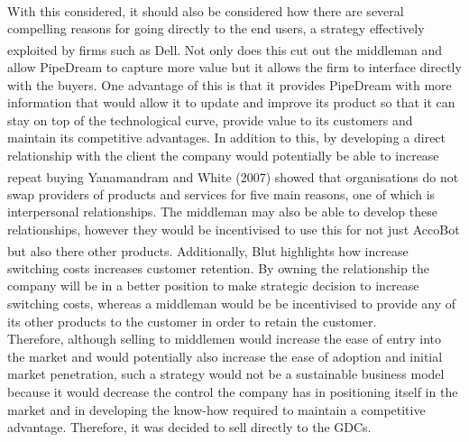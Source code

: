 \documentclass[11pt]{article}		%
\newcommand{\supercite}[1]{\textsuperscript{\cite{#1}}}		%
\begin{document}
    \\
    \hspace*{3ex}With this considered, it should also be considered how there are several compelling reasons for going directly to the end users, a strategy effectively exploited by firms such as Dell.\supercite{business_model} Not only does this cut out the middleman and allow PipeDream to capture more value but it allows the firm to interface directly with the buyers. One advantage of this is that it provides PipeDream with more information that would allow it to update and improve its product so that it can stay on top of the technological curve, provide value to its customers and maintain its competitive advantages. In addition to this, by developing a direct relationship with the client the company would potentially be able to increase repeat buying Yanamandram and White (2007)\supercite{customers} showed that organisations do not swap providers of products and services for five main reasons, one of which is interpersonal relationships. The middleman may also be able to develop these relationships, however they would be incentivised to use this for not just AccoBot but also there other products. Additionally, Blut\supercite{B2Brelations} highlights how increase switching costs increases customer retention. By owning the relationship the company will be in a better position to make strategic decision to increase switching costs, whereas a middleman would be be incentivised to provide any of its other products to the customer in order to retain the customer. 
    \\
    \hspace*{3ex}Therefore, although selling to middlemen would increase the ease of entry into the market and would potentially also increase the ease of adoption and initial market penetration, such a strategy would not be a sustainable business model because it would decrease the control the company has in positioning itself in the market and in developing the know-how required to maintain a competitive advantage. Therefore, it was decided to sell directly to the GDCs.
\end{document}
